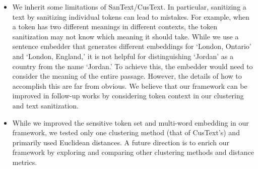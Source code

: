 \documentclass[11pt]{article}
\newcommand{\clusant}{CluSanT\xspace}
\begin{document}
\begin{itemize}
\setlength\itemsep{0em}
    \item We inherit some limitations of SanText/CusText. In particular, sanitizing a text by sanitizing individual tokens can lead to mistakes. For example, when a token has two different meanings in different contexts, the token sanitization may not know which meaning it should take. 
    While we use a sentence embedder that generates different embeddings for `London, Ontario' and `London, England,' it is not helpful for distinguishing `Jordan' as a country from the name `Jordan.' To achieve this, the embedder would need to consider the meaning of the entire passage. However, the details of how to accomplish this are far from obvious. We believe that our framework can be improved in follow-up works by considering token context in our clustering and text sanitization.
    
    \item While we improved the sensitive token set and multi-word embedding in our framework, we tested only one clustering method (that of CusText's) and primarily used Euclidean distances. A future direction is to enrich our framework by exploring and comparing other clustering methods and distance metrics. 

\end{itemize}













%
% 

\appendix


\end{document}
